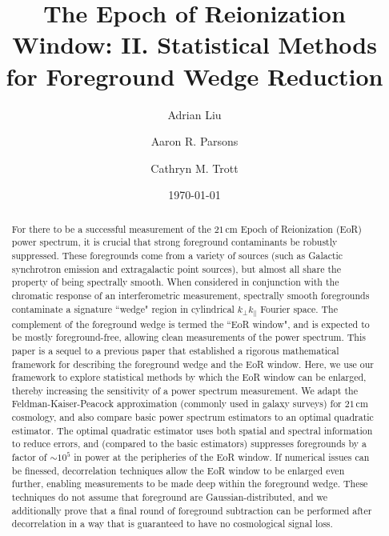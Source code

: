 \documentclass[twocolumn,aps,prd,nofootinbib,showpacs]{revtex4-1}
\begin{document}
\title{The Epoch of Reionization Window: II. Statistical Methods for Foreground Wedge Reduction}

\author{Adrian Liu}
\author{Aaron R. Parsons}
\author{Cathryn M. Trott}
\date{\today}

\newcommand{\apjs}{Astrophys. J. Suppl. Ser.}
\newcommand{\aj}{Astron. J.}
\newcommand{\mnras}{Mon. Not. R. Astron. Soc.}
\newcommand{\apjl}{Astrophys. J. Lett.}
\newcommand{\aap}{Astron. Astrophys.}
\newcommand{\pasa}{PASA}
\newcommand{\physrep}{Phys. Rep.}
\newcommand{\araa}{Annu. Rev. Astron. Astrophys.}




\begin{abstract}
For there to be a successful measurement of the $21\,\textrm{cm}$ Epoch of Reionization (EoR) power spectrum, it is crucial that strong foreground contaminants be robustly suppressed.  These foregrounds come from a variety of sources (such as Galactic synchrotron emission and extragalactic point sources), but almost all share the property of being spectrally smooth.  When considered in conjunction with the chromatic response of an interferometric measurement, spectrally smooth foregrounds contaminate a signature ``wedge" region in cylindrical $k_\perp k_\parallel$ Fourier space.  The complement of the foreground wedge is termed the ``EoR window", and is expected to be mostly foreground-free, allowing clean measurements of the power spectrum.  This paper is a sequel to a previous paper that established a rigorous mathematical framework for describing the foreground wedge and the EoR window.  Here, we use our framework to explore statistical methods by which the EoR window can be enlarged, thereby increasing the sensitivity of a power spectrum measurement.  We adapt the Feldman-Kaiser-Peacock approximation (commonly used in galaxy surveys) for $21\,\textrm{cm}$ cosmology, and also compare basic power spectrum estimators to an optimal quadratic estimator.  The optimal quadratic estimator uses both spatial and spectral information to reduce errors, and (compared to the basic estimators) suppresses foregrounds by a factor of $\sim 10^5$ in power at the peripheries of the EoR window.  If numerical issues can be finessed, decorrelation techniques allow the EoR window to be enlarged even further, enabling measurements to be made deep within the foreground wedge.  These techniques do not assume that foreground are Gaussian-distributed, and we additionally prove that a final round of foreground subtraction can be performed after decorrelation in a way that is guaranteed to have no cosmological signal loss.
\end{abstract}
\end{document}
